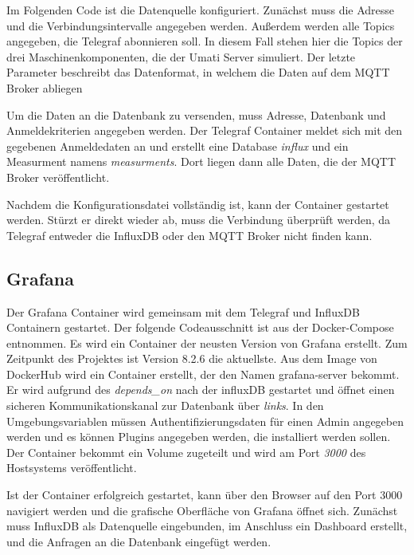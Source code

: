 \documentclass[a4paper, 12pt, oneside, toc=listofnumbered, bibliography=totoc]{scrbook}
\begin{document}
			Im Folgenden Code ist die Datenquelle konfiguriert. Zunächst muss die Adresse und die Verbindungsintervalle angegeben werden. Außerdem werden alle Topics angegeben, die Telegraf abonnieren soll. In diesem Fall stehen hier die Topics der drei Maschinenkomponenten, die der Umati Server simuliert. Der letzte Parameter beschreibt das Datenformat, in welchem die Daten auf dem MQTT Broker abliegen
			
			
			
			Um die Daten an die Datenbank zu versenden, muss Adresse, Datenbank und Anmeldekriterien angegeben werden. Der Telegraf Container meldet sich mit den gegebenen Anmeldedaten an und erstellt eine Database \textit{influx} und ein Measurment namens \textit{measurments}. Dort liegen dann alle Daten, die der MQTT Broker veröffentlicht. 
			
			
			
			Nachdem die Konfigurationsdatei vollständig ist, kann der Container gestartet werden. Stürzt er direkt wieder ab, muss die Verbindung überprüft werden, da Telegraf entweder die InfluxDB oder den MQTT Broker nicht finden kann.
		
		\subsection{Grafana}
		
		Der Grafana Container wird gemeinsam mit dem Telegraf und InfluxDB Containern gestartet. Der folgende Codeausschnitt ist aus der Docker-Compose entnommen. Es wird ein Container der neusten Version von Grafana erstellt. Zum Zeitpunkt des Projektes ist Version 8.2.6 die aktuellste. Aus dem Image von DockerHub wird ein Container erstellt, der den Namen grafana-server bekommt. Er wird aufgrund des \textit{depends\_on} nach der influxDB gestartet und öffnet einen sicheren Kommunikationskanal zur Datenbank über \textit{links}. In den Umgebungsvariablen müssen Authentifizierungsdaten für einen Admin angegeben werden und es können Plugins angegeben werden, die installiert werden sollen. Der Container bekommt ein Volume zugeteilt und wird am Port \textit{3000} des Hostsystems veröffentlicht. 
		
		
		
		Ist der Container erfolgreich gestartet, kann über den Browser auf den Port 3000 navigiert werden und die grafische Oberfläche von Grafana öffnet sich. Zunächst muss InfluxDB als Datenquelle eingebunden, im Anschluss ein Dashboard erstellt, und die Anfragen an die Datenbank eingefügt werden. 
		
\end{document}
